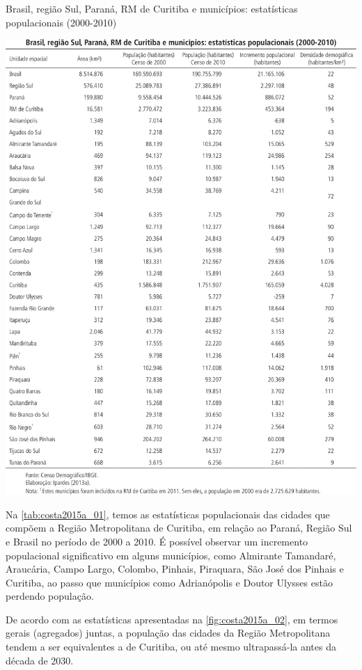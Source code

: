 	\begin{table}
		\centering
		\caption{Brasil, região Sul, Paraná, RM de Curitiba e municípios: estatísticas populacionais (2000-2010)}
		\includegraphics[width=1.0\linewidth]{img/costa2015a_01}
		\label{tab:costa2015a_01}
	\end{table}
	
	Na \autoref{tab:costa2015a_01}, temos as estatísticas populacionais das cidades que compõem a Região Metropolitana de Curitiba, em relação ao Paraná, Região Sul e Brasil no período de 2000 a 2010. É possível observar um incremento populacional significativo em alguns municípios, como Almirante Tamandaré, Araucária, Campo Largo, Colombo, Pinhais, Piraquara, São José dos Pinhais e Curitiba, ao passo que municípios como Adrianópolis e Doutor Ulysses estão perdendo população. 
	
	De acordo com as estatísticas apresentadas na \autoref{fig:costa2015a_02}, em termos gerais (agregados) juntas, a população das cidades da Região Metropolitana tendem a ser equivalentes a de Curitiba, ou até mesmo ultrapassá-la antes da década de 2030.
	
